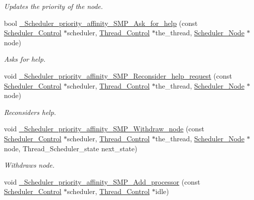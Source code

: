 \begin{DoxyCompactItemize}
\begin{DoxyCompactList}\small\item\em Updates the priority of the node. \end{DoxyCompactList}\item 
bool \mbox{\hyperlink{group__RTEMSScoreSchedulerPriorityAffinitySMP_ga927e0d514f2687a98d8f6d967c71030a}{\+\_\+\+Scheduler\+\_\+priority\+\_\+affinity\+\_\+\+S\+M\+P\+\_\+\+Ask\+\_\+for\+\_\+help}} (const \mbox{\hyperlink{struct__Scheduler__Control}{Scheduler\+\_\+\+Control}} $\ast$scheduler, \mbox{\hyperlink{struct__Thread__Control}{Thread\+\_\+\+Control}} $\ast$the\+\_\+thread, \mbox{\hyperlink{structScheduler__Node}{Scheduler\+\_\+\+Node}} $\ast$node)
\begin{DoxyCompactList}\small\item\em Asks for help. \end{DoxyCompactList}\item 
void \mbox{\hyperlink{group__RTEMSScoreSchedulerPriorityAffinitySMP_gac1bc4e5237d4e53cd6c457ba115cda53}{\+\_\+\+Scheduler\+\_\+priority\+\_\+affinity\+\_\+\+S\+M\+P\+\_\+\+Reconsider\+\_\+help\+\_\+request}} (const \mbox{\hyperlink{struct__Scheduler__Control}{Scheduler\+\_\+\+Control}} $\ast$scheduler, \mbox{\hyperlink{struct__Thread__Control}{Thread\+\_\+\+Control}} $\ast$the\+\_\+thread, \mbox{\hyperlink{structScheduler__Node}{Scheduler\+\_\+\+Node}} $\ast$node)
\begin{DoxyCompactList}\small\item\em Reconsiders help. \end{DoxyCompactList}\item 
void \mbox{\hyperlink{group__RTEMSScoreSchedulerPriorityAffinitySMP_ga79a3f78d0e7c98dd3f975d7c496e0876}{\+\_\+\+Scheduler\+\_\+priority\+\_\+affinity\+\_\+\+S\+M\+P\+\_\+\+Withdraw\+\_\+node}} (const \mbox{\hyperlink{struct__Scheduler__Control}{Scheduler\+\_\+\+Control}} $\ast$scheduler, \mbox{\hyperlink{struct__Thread__Control}{Thread\+\_\+\+Control}} $\ast$the\+\_\+thread, \mbox{\hyperlink{structScheduler__Node}{Scheduler\+\_\+\+Node}} $\ast$node, Thread\+\_\+\+Scheduler\+\_\+state next\+\_\+state)
\begin{DoxyCompactList}\small\item\em Withdraws node. \end{DoxyCompactList}\item 
void \mbox{\hyperlink{group__RTEMSScoreSchedulerPriorityAffinitySMP_ga82529b3ece52d142315bea52e6edf5fb}{\+\_\+\+Scheduler\+\_\+priority\+\_\+affinity\+\_\+\+S\+M\+P\+\_\+\+Add\+\_\+processor}} (const \mbox{\hyperlink{struct__Scheduler__Control}{Scheduler\+\_\+\+Control}} $\ast$scheduler, \mbox{\hyperlink{struct__Thread__Control}{Thread\+\_\+\+Control}} $\ast$idle)

\end{DoxyCompactItemize}
